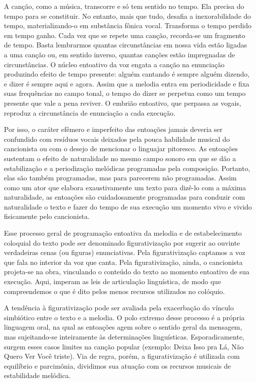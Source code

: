 A canção, como a música, transcorre e só tem sentido no tempo. Ela
precisa do tempo para se constituir. No entanto, mais que tudo, desafia
a inexorabilidade do tempo, materializando-o em substância fônica vocal.
Transforma o tempo perdido em tempo ganho. Cada vez que se repete uma
canção, recorda-se um fragmento de tempo. Basta lembrarmos quantas
circunstâncias em nossa vida estão ligadas a uma canção ou, em sentido
inverso, quantas canções estão impregnadas de circunstâncias. O núcleo
entoativo da voz engata a canção na enunciação produzindo efeito de
tempo presente: alguém cantando é sempre alguém dizendo, e dizer é
sempre aqui e agora. Assim que a melodia entra em periodicidade e fixa
suas frequências no campo tonal, o tempo do dizer se perpetua como um
tempo presente que vale a pena reviver. O embrião entoativo, que
perpassa as vogais, reproduz a circunstância de enunciação a cada
execução.

Por isso, o caráter efêmero e imperfeito das entoações jamais deveria
ser confundido com resíduos vocais deixados pela pouca habilidade
musical do cancionista ou com o desejo de mencionar o linguajar
pitoresco. As entoações sustentam o efeito de naturalidade no mesmo
campo sonoro em que se dão a estabilização e a periodização melódicas
programadas pela composição. Portanto, elas são também programadas, mas
para parecerem não programadas. Assim como um ator que elabora
exaustivamente um texto para dizê-lo com a máxima naturalidade, as
entoações são cuidadosamente programadas para conduzir com naturalidade
o texto e fazer do tempo de sua execução um momento vivo e vivido
fisicamente pelo cancionista.

Esse processo geral de programação entoativa da melodia e de
estabelecimento coloquial do texto pode ser denominado figurativização
por sugerir ao ouvinte verdadeiras cenas (ou figuras) enunciativas. Pela
figurativização captamos a voz que fala no interior da voz que canta.
Pela figurativização, ainda, o cancionista projeta-se na obra,
vinculando o conteúdo do texto ao momento entoativo de sua execução.
Aqui, imperam as leis de articulação linguística, de modo que
compreendemos o que é dito pelos menos recursos utilizados no colóquio.

A tendência à figurativização pode ser avaliada pela exacerbação do
vínculo simbiótico entre o texto e a melodia. O polo extremo desse
processo é a própria linguagem oral, na qual as entoações agem sobre o
sentido geral da mensagem, mas sujeitando-se inteiramente às
determinações linguísticas. Esporadicamente, surgem esses casos limites
na canção popular (exemplo: Deixa Isso pra Lá, Não Quero Ver Você
triste). Via de regra, porém, a figurativização é utilizada com
equilíbrio e parcimônia, dividimos sua atuação com os recursos musicais
de estabilidade melódica.

